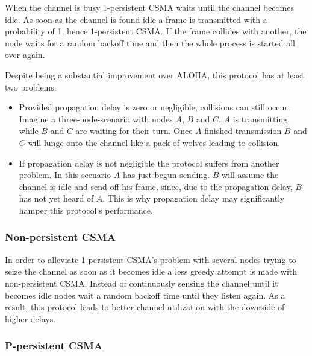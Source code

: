 
When the channel is busy 1-persistent CSMA waits until the channel becomes idle. As soon as the channel is found idle a frame is transmitted with a probability of 1, hence 1-persistent CSMA. If the frame collides with another, the node waits for a random backoff time and then the whole process is started all over again.

\bigskip

Despite being a substantial improvement over ALOHA, this protocol has at least two problems:

\begin{itemize}
	\item Provided propagation delay is zero or negligible, collisions can still occur.  Imagine a three-node-scenario with nodes $A$, $B$ and $C$. $A$ is transmitting, while $B$ and $C$ are waiting for their turn. Once $A$ finished transmission $B$ and $C$ will lunge onto the channel like a pack of wolves leading to collision.
	
	\item If propagation delay is not negligible the protocol suffers from another problem. In this scenario $A$ has just begun sending. $B$ will assume the channel is idle and send off his frame, since, due to the propagation delay, $B$ has not yet heard of $A$. This is why propagation delay may significantly hamper this protocol's performance.
\end{itemize}  

\subsubsection{Non-persistent CSMA}


In order to alleviate 1-persistent CSMA's problem with several nodes trying to seize the channel as soon as it becomes idle a less greedy attempt is made with non-persistent CSMA. Instead of continuously sensing the channel until it becomes idle nodes wait a random backoff time until they listen again. As a result, this protocol leads to better channel utilization with the downside of higher delays.

\subsubsection{P-persistent CSMA}


